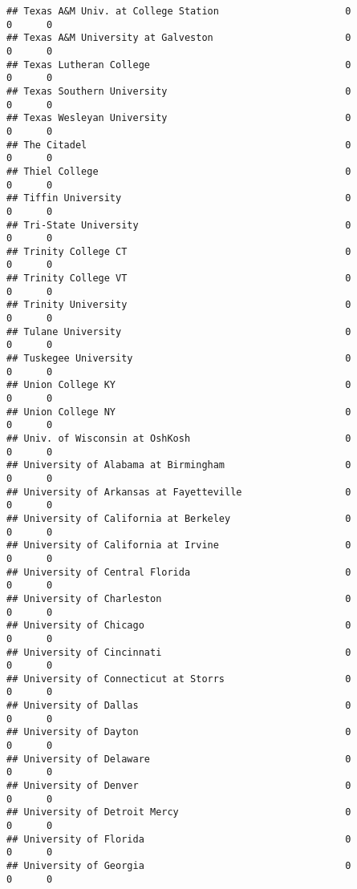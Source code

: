 \documentclass[
]{article}
\begin{document}
\begin{verbatim}
## Texas A&M Univ. at College Station                      0          0      0
## Texas A&M University at Galveston                       0          0      0
## Texas Lutheran College                                  0          0      0
## Texas Southern University                               0          0      0
## Texas Wesleyan University                               0          0      0
## The Citadel                                             0          0      0
## Thiel College                                           0          0      0
## Tiffin University                                       0          0      0
## Tri-State University                                    0          0      0
## Trinity College CT                                      0          0      0
## Trinity College VT                                      0          0      0
## Trinity University                                      0          0      0
## Tulane University                                       0          0      0
## Tuskegee University                                     0          0      0
## Union College KY                                        0          0      0
## Union College NY                                        0          0      0
## Univ. of Wisconsin at OshKosh                           0          0      0
## University of Alabama at Birmingham                     0          0      0
## University of Arkansas at Fayetteville                  0          0      0
## University of California at Berkeley                    0          0      0
## University of California at Irvine                      0          0      0
## University of Central Florida                           0          0      0
## University of Charleston                                0          0      0
## University of Chicago                                   0          0      0
## University of Cincinnati                                0          0      0
## University of Connecticut at Storrs                     0          0      0
## University of Dallas                                    0          0      0
## University of Dayton                                    0          0      0
## University of Delaware                                  0          0      0
## University of Denver                                    0          0      0
## University of Detroit Mercy                             0          0      0
## University of Florida                                   0          0      0
## University of Georgia                                   0          0      0

\end{verbatim}
\end{document}
